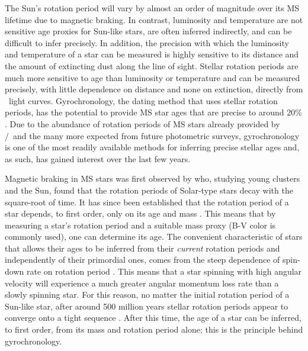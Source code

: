 The Sun's rotation period will vary by almost an order of magnitude over its
MS lifetime due to magnetic braking.
In contrast, luminosity and temperature are not sensitive age proxies for
Sun-like stars, are often inferred indirectly, and can be difficult to infer
precisely.
In addition, the precision with which the luminosity and temperature of a star
can be measured is highly sensitive to its distance and the amount of
extincting dust along the line of sight.
Stellar rotation periods are much more sensitive to age than luminosity or
temperature and can be measured precisely, with little dependence on distance
and none on extinction, directly from \kepler\ light curves.
Gyrochronology, the dating method that uses stellar rotation periods, has the
potential to provide MS star ages that are precise to around 20\%
\citep{epstein2014}.
Due to the abundance of rotation periods of MS stars already provided by
\kepler/\ktwo\ and the many more expected from future photometric surveys,
gyrochronology is one of the most readily available methods for inferring
precise stellar ages and, as such, has gained interest over the last few
years.

Magnetic braking in MS stars was first observed by \citet{Skumanich1972} who,
studying young clusters and the Sun, found that the rotation periods of
Solar-type stars decay with the square-root of time.
It has since been established that the rotation period of a star depends, to
first order, only on its age and mass \citep[\eg][]{barnes2003}.
This means that by measuring a star's rotation period and a suitable mass
proxy (B-V color is commonly used), one can determine its age.
The convenient characteristic of stars that allows their ages to be inferred
from their {\it current} rotation periods and independently of their
primordial ones, comes from the steep dependence of spin-down rate on rotation
period \citep{kawaler1989}.
This means that a star spinning with high angular velocity will experience a
much greater angular momentum loss rate than a slowly spinning star.
For this reason, no matter the initial rotation period of a Sun-like star,
after around 500 million years stellar rotation periods appear to converge
onto a tight sequence .
After this time, the age of a star can be inferred, to first order, from its
mass and rotation period alone; this is the principle behind gyrochronology.

